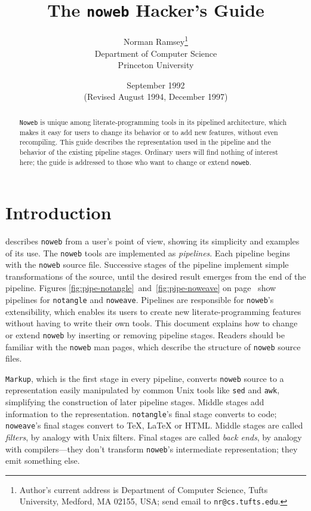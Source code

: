\documentclass{article}
\title{The {\tt noweb} Hacker's Guide}
\author{Norman Ramsey\thanks{Author's current address is Department of
Computer Science, Tufts University, Medford, MA 02155, USA;
send email to {\tt nr@cs.tufts.edu}.}\\Department of Computer Science\\
Princeton University}
\date{September 1992\\(Revised August 1994, December 1997)}
\begin{document}
\maketitle

\begin{abstract}
{\tt Noweb} is unique among literate-programming tools in its
pipelined architecture, which makes it easy for users to change
its behavior or to add new features, without even recompiling.
This guide describes the representation used in the
pipeline and the behavior of the existing pipeline stages.
Ordinary users will find nothing of interest here; the guide is
addressed to those who want to change or extend {\tt noweb}.
\end{abstract}

\clearpage

\tableofcontents
\listoftables

\newpage

\section{Introduction}

 describes {\tt {\tt noweb}} from a user's
point of view, showing its simplicity and examples of its use.
The {\tt {\tt noweb}} tools are implemented as {\em pipelines}.
Each pipeline begins with the {\tt noweb}
source file.  Successive stages of the pipeline implement simple
transformations of the source, until the desired result emerges from
the end of the pipeline.  Figures
\ref{fig:pipe-notangle}~and~\ref{fig:pipe-noweave} on
page~\pageref{fig:pipe-notangle} show pipelines for
{\tt notangle} and {\tt noweave}.  
Pipelines are responsible for {\tt {\tt noweb}}'s
extensibility, which enables its users to create new literate-programming
features without having to write their own tools.
This document explains how to change or extend {\tt noweb} by
inserting or removing pipeline stages.
Readers should be familiar with the {\tt {\tt noweb}} man pages, which
describe the structure of {\tt {\tt noweb}} source files.

{\tt Markup}, which is the first stage in
every pipeline, converts {\tt noweb} source to a representation easily
manipulated by common Unix tools like {\tt sed} and {\tt awk}, simplifying
the construction of later pipeline stages.  Middle stages add
information to the representation.  {\tt notangle}'s final stage converts to
code; {\tt noweave}'s final stages convert to TeX, LaTeX or HTML.
Middle stages are called {\em filters}, by analogy with Unix filters.
Final stages are called {\em back ends}, by analogy with
compilers---they don't transform {\tt {\tt noweb}}'s intermediate
representation; they emit something else.
\end{document}
